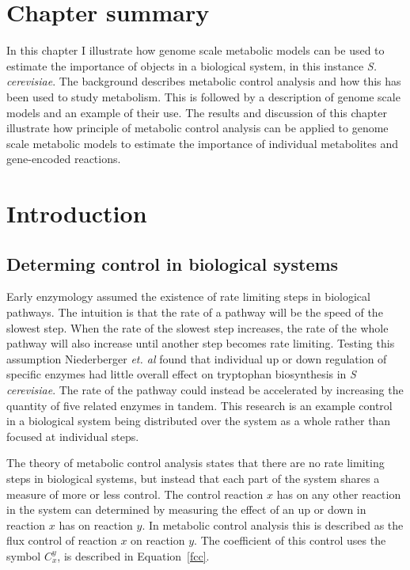 \section*{Chapter summary}

In this chapter I illustrate how genome scale metabolic models can be used to estimate the importance of objects in a biological system, in this instance \emph{S. cerevisiae}. The background describes metabolic control analysis and how this has been used to study metabolism. This is followed by a description of genome scale models and an example of their use. The results and discussion of this chapter illustrate how principle of metabolic control analysis can be applied to genome scale metabolic models to estimate the importance of individual metabolites and gene-encoded reactions.

\clearpage

\section{Introduction}

\subsection{Determing control in biological systems}

Early enzymology assumed the existence of rate limiting steps in biological pathways. The intuition is that the rate of a pathway will be the speed of the slowest step. When the rate of the slowest step increases, the rate of the whole pathway will also increase until another step becomes rate limiting. Testing this assumption Niederberger \emph{et. al} \cite{niederberger1992} found that individual up or down regulation of specific enzymes had little overall effect on tryptophan biosynthesis in \emph{S cerevisiae}. The rate of the pathway could instead be accelerated by increasing the quantity of five related enzymes in tandem. This research is an example control in a biological system being distributed over the system as a whole rather than focused at individual steps.

The theory of metabolic control analysis \cite{fell1992,fell1997} states that there are no rate limiting steps in biological systems, but instead that each part of the system shares a measure of more or less control. The control reaction $x$ has on any other reaction in the system can determined by measuring the effect of an up or down in reaction $x$ has on reaction $y$. In metabolic control analysis this is described as the flux control of reaction $x$ on reaction $y$. The coefficient of this control uses the symbol $C_{x}^{y}$, is described in Equation~\vref{fcc}.

